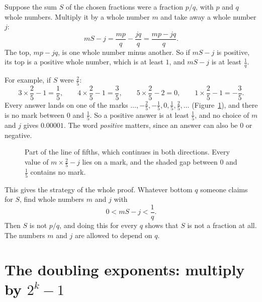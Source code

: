 \documentclass[10pt]{article}
\theoremstyle{plain}
\theoremstyle{definition}
\theoremstyle{remark}
\begin{document}
Suppose the sum $S$ of the chosen fractions were a fraction $p/q$, with $p$
and $q$ whole numbers.
Multiply it by a whole number $m$ and take away a whole number $j$:
\[
 mS-j=\frac{mp}q-\frac{jq}q=\frac{mp-jq}q .
\]
The top, $mp-jq$, is one whole number minus another. So if $mS-j$ is
positive, its top is a positive whole number, which is at least $1$, and
$mS-j$ is at least $\tfrac1q$.

For example, if $S$ were $\tfrac25$:
\[
 3\times\frac25-1=\frac15,\qquad 4\times\frac25-1=\frac35,\qquad
 5\times\frac25-2=0,\qquad 1\times\frac25-1=-\frac35 .
\]
Every answer lands on one of the marks
$\dots,-\tfrac25,-\tfrac15,0,\tfrac15,\tfrac25,\dots$ (Figure~\ref{fig:fifths}),
and there is no mark between $0$ and $\tfrac15$. So a positive answer is at
least $\tfrac15$, and no choice of $m$ and $j$ gives $0.00001$.
The word \emph{positive} matters, since an answer can also be $0$ or negative.

\begin{figure}[htb]
\centering
{}
\caption{Part of the line of fifths, which continues in both directions. Every value of $m\times\tfrac25-j$ lies on a mark, and the shaded
gap between $0$ and $\tfrac15$ contains no mark.}
\label{fig:fifths}
\end{figure}

This gives the strategy of the whole proof. Whatever bottom $q$ someone
claims for $S$, find whole numbers $m$ and $j$ with
\[
 0<mS-j<\frac1q .
\]
Then $S$ is not $p/q$, and doing this for every $q$ shows that $S$ is not a
fraction at all. The numbers $m$ and $j$ are allowed to depend on $q$.

\section{The doubling exponents: multiply by \texorpdfstring{$2^k-1$}{2\^{}k-1}}\label{sec:doubling}
\end{document}
